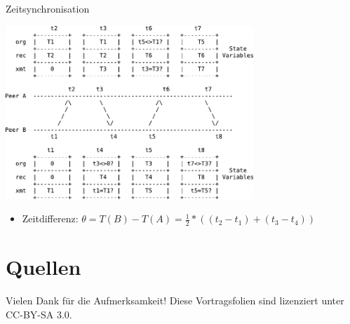 \documentclass{beamer}
\begin{document}
\begin{frame}{Zeitsynchronisation}
  \begin{center}
    \includegraphics[width=0.7\textwidth]{algo.pdf}
  \end{center}

  \pause

  \begin{itemize}
    \item[] Zeitdifferenz:
      $\theta = T(B) - T(A) = \frac12 * \left((t_2-t_1) + (t_3-t_4)\right)$
  \end{itemize}

\end{frame}

\section{Quellen}
\begin{frame}
  \centering
  \vfill
  Vielen Dank für die Aufmerksamkeit!
  \vfill
  {\footnotesize Diese Vortragsfolien sind lizenziert unter CC-BY-SA 3.0.}
  \vfill
  \begin{thebibliography}{9}
  \end{thebibliography}

\end{frame}
\end{document}

